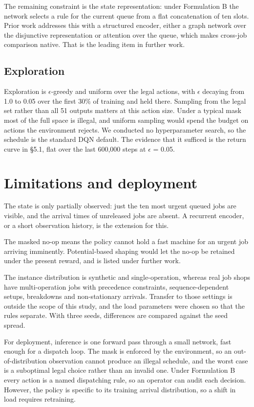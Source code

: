 The remaining constraint is the state representation: under Formulation B the network selects a
rule for the current queue from a flat concatenation of ten slots.
Prior work addresses this with a structured encoder, either a graph network over the disjunctive
representation or attention over the queue, which makes cross-job comparison native. That is the
leading item in further work.

\subsection{Exploration}\label{exploration}

Exploration is $\epsilon$-greedy and uniform over the legal actions, with $\epsilon$ decaying from 1.0 to 0.05 over
the first 30\% of training and held there. Sampling from the legal set rather than all 51 outputs
matters at this action size. Under a typical mask most of the full space is illegal, and uniform
sampling would spend the budget on actions the environment rejects. We conducted no hyperparameter
search, so the schedule is the standard DQN default. The evidence that it sufficed is the return curve in
§5.1, flat over the last 600,000 steps at $\epsilon$ = 0.05.

\section{Limitations and deployment}\label{limitations-and-deployment-considerations}

The state is only partially observed: just the ten most urgent queued jobs are visible, and the
arrival times of unreleased jobs are absent. A recurrent encoder, or a short observation history, is the extension for this.

The masked no-op means the policy cannot hold a fast machine for an urgent job arriving
imminently. Potential-based shaping would let the no-op be retained under the present reward,
and is listed under further work.

The instance distribution is synthetic and single-operation, whereas real job shops have
multi-operation jobs with precedence constraints, sequence-dependent setups, breakdowns and
non-stationary arrivals. Transfer to those settings is outside the scope of this study, and the load parameters were
chosen so that the rules separate. With three seeds, differences are compared against the seed
spread.

For deployment, inference is one forward pass through a small network, fast enough for a dispatch loop. The mask is enforced by the
environment, so an out-of-distribution observation cannot produce an illegal schedule, and the
worst case is a suboptimal legal choice rather than an invalid one. Under Formulation B every action is
a named dispatching rule, so an operator can audit each decision. However, the policy is specific to its training arrival
distribution, so a shift in load requires retraining.

